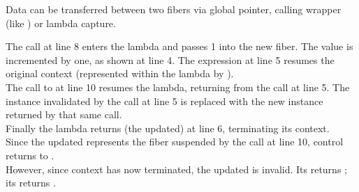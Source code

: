 
Data can be transferred between two fibers via global pointer, calling
wrapper (like ) or lambda capture.

The \resume call at line 8 enters the lambda and passes 1 into the
new fiber. The value is incremented by one, as shown at line 4. The expression
 at line 5 resumes the original context (represented
within the lambda by ).\\
The call to  at line 10 resumes the lambda, returning from
the  call at line 5. The \fiber instance 
invalidated by the \resume call at line 5 is replaced with the new instance
returned by that same \resume call.\\
Finally the lambda returns (the updated)  at line 6, terminating its
context.\\

Since the updated  represents the fiber suspended by the call at
line 10, control returns to \main.\\

However, since context  has now terminated, the updated 
is invalid. Its \opbool returns ; its  returns
.\\

